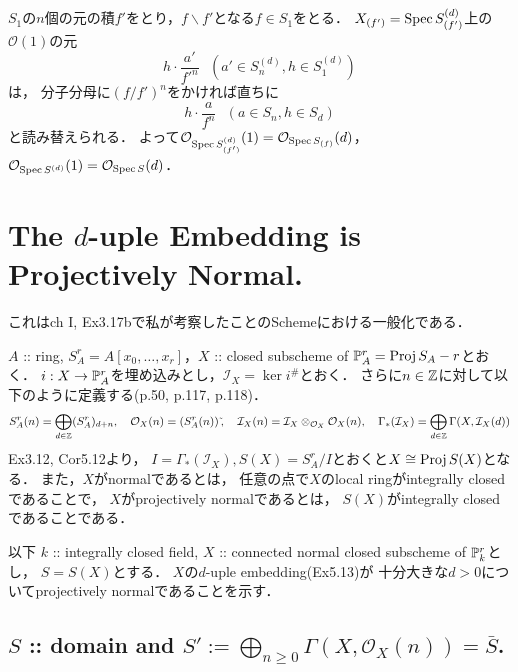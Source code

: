 \documentclass[a4paper]{jsarticle}
\newcommand{\shI}{\mathcal{I}}
\newcommand{\shO}{\mathcal{O}}
\newcommand{\Proj}{\operatorname{Proj}}
\newcommand{\sidetilde}{\,\tilde{}}
\begin{document}
    $S_1$の$n$個の元の積$f'$をとり，$f \backslash f'$となる$f \in S_1$をとる．
    $X_{(f')}=\operatorname{Spec} S_{(f')}^{(d)}$上の$\shO(1)$の元
    \[ h \cdot \frac{a'}{f'^n} ~~~(a' \in S_n^{(d)}, h \in S_1^{(d)}) \]は，
    分子分母に$(f/f')^n$をかければ直ちに
    \[ h \cdot \frac{a}{f^{n}} ~~~ (a \in S_{n}, h \in S_d) \]と読み替えられる．
    よって$\shO_{\Spec S_{(f')}^{(d)}}(1)=\shO_{\Spec S_{(f)}}(d)$，
    $\shO_{\Spec S^{(d)}}(1)=\shO_{\Spec S}(d)$．

\section{The $d$-uple Embedding is Projectively Normal.} %
    これはch I, Ex3.17bで私が考察したことのSchemeにおける一般化である．

    $A$ :: ring, $S_A^r=A[x_0,\dots,x_r]$，$X$ :: closed subscheme of $\proj^r_A=\Proj S_A-r$とおく．
    $i: X \to \mathbb{P}^r_A$を埋め込みとし，$\shI_X=\ker i^{\#}$とおく．
    さらに$n \in \mathbb{Z}$に対して以下のように定義する(p.50, p.117, p.118)．
    \[
        S_A^r(n)=\bigoplus_{d \in \Z} (S_A^r)_{d+n},~~~
        \shO_X(n)=(S_A^r(n))\sidetilde,~~~
        \shI_X(n)=\shI_X \otimes_{\shO_X} \shO_X(n),~~~
        \Gamma_*(\shI_X)=\bigoplus_{d \in \Z} \Gamma(X,\shI_X(d))
    \]
    Ex3.12, Cor5.12より，
    $I=\Gamma_*(\shI_X), S(X)=S_A^r/I$とおくと$X \iso \Proj S(X)$となる．
    また，$X$がnormalであるとは，
    任意の点で$X$のlocal ringがintegrally closedであることで，
    $X$がprojectively normalであるとは，
    $S(X)$がintegrally closedであることである．

    以下
    $k$ :: integrally closed field,
    $X$ :: connected normal closed subscheme of $\mathbb{P}_k^r$とし，
    $S=S(X)$とする．
    $X$の$d$-uple embedding(Ex5.13)が
    十分大きな$d>0$についてprojectively normalであることを示す．

    \subsection{$S$ :: domain and $S':=\bigoplus_{n \geq 0} \Gamma(X,\shO_X(n))=\bar{S}$.}
\end{document}
